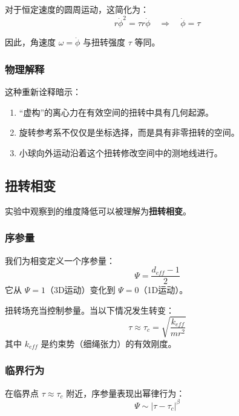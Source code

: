 \documentclass[12pt,a4paper]{article}
\begin{document}
对于恒定速度的圆周运动，这简化为：
\begin{equation}
    r\dot{\phi}^2 = \tau r \dot{\phi} \quad \Rightarrow \quad \dot{\phi} = \tau
\end{equation}

因此，角速度 $\omega = \dot{\phi}$ 与扭转强度 $\tau$ 等同。

\subsubsection{物理解释}

这种重新诠释暗示：
\begin{enumerate}
    \item ``虚构''的离心力在有效空间的扭转中具有几何起源。
    \item 旋转参考系不仅仅是坐标选择，而是具有非零扭转的空间。
    \item 小球向外运动沿着这个扭转修改空间中的测地线进行。
\end{enumerate}

\subsection{扭转相变}

实验中观察到的维度降低可以被理解为\textbf{扭转相变}。

\subsubsection{序参量}

我们为相变定义一个序参量：
\begin{equation}
    \Psi = \frac{d_{eff} - 1}{2}
\end{equation}
它从 $\Psi = 1$（3D运动）变化到 $\Psi = 0$（1D运动）。

扭转场充当控制参量。当以下情况发生转变：
\begin{equation}
    \tau \approx \tau_c = \sqrt{\frac{k_{eff}}{mr^2}}
\end{equation}
其中 $k_{eff}$ 是约束势（细绳张力）的有效刚度。

\subsubsection{临界行为}

在临界点 $\tau \approx \tau_c$ 附近，序参量表现出幂律行为：
\begin{equation}
    \Psi \sim |\tau - \tau_c|^\beta
\end{equation}
\end{document}

